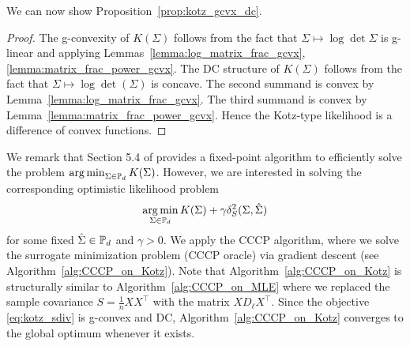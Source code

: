 \documentclass[sn-nature]{sn-jnl}%
\theoremstyle{thmstyleone}%
\theoremstyle{thmstyletwo}%
\theoremstyle{thmstylethree}%
\begin{document}
We can now show Proposition~\ref{prop:kotz_gcvx_dc}.
\begin{proof}
The g-convexity of $K(\Sigma)$ follows from the fact that $\Sigma \mapsto \log \det \Sigma$ is g-linear and applying Lemmas~\ref{lemma:log_matrix_frac_gcvx},\ref{lemma:matrix_frac_power_gcvx}.
The DC structure of $K(\Sigma)$ follows from the fact that $\Sigma \mapsto \log \det (\Sigma)$ is concave. The second summand is convex by Lemma~\ref{lemma:log_matrix_frac_gcvx}. The third summand is convex by Lemma~\ref{lemma:matrix_frac_power_gcvx}. Hence the Kotz-type likelihood is a difference of convex functions.
\end{proof}
We remark that Section 5.4 of \cite{Sra_conic_geometric_Opt_SPD} provides a fixed-point algorithm to efficiently solve the problem $\operatorname*{arg\,min}_{\Sigma \in \mathbb{P}_d} K(\Sigma)$. However, we are interested in solving the corresponding optimistic likelihood problem
    \begin{equation}\label{eq:kotz_sdiv}
        \operatorname*{arg\,min}_{\Sigma \in \mathbb{P}_d} K(\Sigma) + \gamma \delta_S^2(\Sigma, \hat{\Sigma}) 
    \end{equation}
    for some fixed $\hat{\Sigma} \in \mathbb{P}_d$ and $\gamma > 0$. We apply the CCCP algorithm, where we solve the surrogate minimization problem (CCCP oracle) via gradient descent (see Algorithm~\ref{alg:CCCP_on_Kotz}).  Note that Algorithm~\ref{alg:CCCP_on_Kotz} is structurally similar to Algorithm~\ref{alg:CCCP_on_MLE} where we replaced the sample covariance $S = \frac{1}{n}X X^\top$ with the matrix $X D_{\ell} X^\top$. Since the objective \eqref{eq:kotz_sdiv} is g-convex and DC, Algorithm~\ref{alg:CCCP_on_Kotz} converges to the global optimum whenever it exists.
\end{document}
